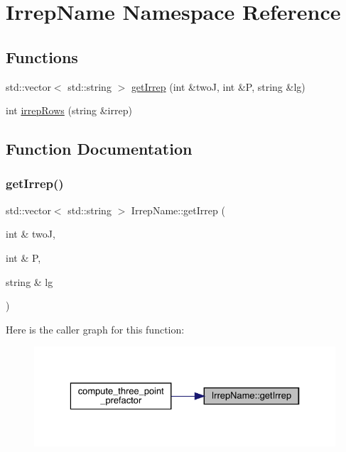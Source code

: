 \hypertarget{namespaceIrrepName}{}\section{Irrep\+Name Namespace Reference}
\label{namespaceIrrepName}
\subsection*{Functions}
\begin{DoxyCompactItemize}
\item 
std\+::vector$<$ std\+::string $>$ \mbox{\hyperlink{namespaceIrrepName_aafd6a227d49ac073e93e6954332007bf}{get\+Irrep}} (int \&twoJ, int \&P, string \&lg)
\item 
int \mbox{\hyperlink{namespaceIrrepName_a3964736788de2a425b5a41ff069f907b}{irrep\+Rows}} (string \&irrep)
\end{DoxyCompactItemize}


\subsection{Function Documentation}
\mbox{\label{namespaceIrrepName_aafd6a227d49ac073e93e6954332007bf}} 
\subsubsection{\texorpdfstring{getIrrep()}{getIrrep()}}
{\footnotesize\ttfamily std\+::vector$<$ std\+::string $>$ Irrep\+Name\+::get\+Irrep (\begin{DoxyParamCaption}\item[{int \&}]{twoJ,  }\item[{int \&}]{P,  }\item[{string \&}]{lg }\end{DoxyParamCaption})}

Here is the caller graph for this function\+:\nopagebreak
\begin{figure}[H]
\begin{center}
\leavevmode
\includegraphics[width=329pt]{d8/dcc/namespaceIrrepName_aafd6a227d49ac073e93e6954332007bf_icgraph}
\end{center}
\end{figure}
\mbox{\label{namespaceIrrepName_a3964736788de2a425b5a41ff069f907b}} 
